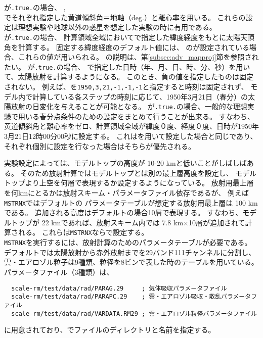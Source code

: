 が\verb|.true.|の場合、
, \\
でそれぞれ指定した黄道傾斜角＝地軸（deg.）と離心率を用いる。
これらの設定は理想実験や地球以外の惑星を想定した実験の時に有用である。\\
%
が\verb|.true.|の場合、
計算領域全域においてで指定した緯度経度をもとに太陽天頂角を計算する。
固定する緯度経度のデフォルト値には、
のが設定されている場合、これらの値が用いられる。
の説明は、第\ref{subsec:adv_mapproj}節を参照されたい。
%
が\verb|.true.|の場合、
で指定した日時（年、月、日、時、分、秒）を用いて、太陽放射を計算するようになる。
このとき、負の値を指定したものは固定されない。
例えば、を\verb|1950,3,21,-1,-1,-1|と指定すると時刻は固定されず、
モデル内で計算している各ステップの時刻に応じて、1950年3月21日（春分）の太陽放射の日変化を与えることが可能となる。
%
が\verb|.true.|の場合、一般的な理想実験で用いる春分点条件のための設定をまとめて行うことが出来る。
すなわち、黄道傾斜角と離心率をゼロ、計算領域全域が緯度０度、経度０度、日時が1950年3月21日12時00分00秒に設定する。
これはを用いて設定した場合と同じであり、
それぞれ個別に設定を行なった場合はそちらが優先される。

実験設定によっては、モデルトップの高度が 10-20 kmと低いことがしばしばある。
そのため放射計算ではモデルトップとは別の最上層高度を設定し、
モデルトップより上空を何層で表現するか設定するようになっている。
放射用最上層を何kmにとるかは放射スキーム・パラメータファイル依存であるが、
例えば\verb|MSTRNX|ではデフォルトの
パラメータテーブルが想定する放射用最上層は 100 kmである。
追加される高度はデフォルトの場合10層で表現する。
すなわち、モデルトップが 22 kmであれば、放射スキーム内では
 7.8 km$\times$10層が追加されて計算される。
これらは\verb|MSTRNX|ならで設定する。\\

\verb|MSTRNX|を実行するには、放射計算のためのパラメータテーブルが必要である。
デフォルトでは太陽放射から赤外放射までを29バンド111チャンネルに分割し、
雲・エアロゾル粒子は9種類、粒径を8ビンで表した時のテーブルを用いている。
パラメータファイル（3種類）は、
\begin{verbatim}
  scale-rm/test/data/rad/PARAG.29     ; 気体吸収パラメータファイル
  scale-rm/test/data/rad/PARAPC.29    ; 雲・エアロゾル吸収・散乱パラメータファイル
  scale-rm/test/data/rad/VARDATA.RM29 ; 雲・エアロゾル粒径パラメータファイル
\end{verbatim}
に用意されており、でファイルのディレクトリと名前を指定する。\\

